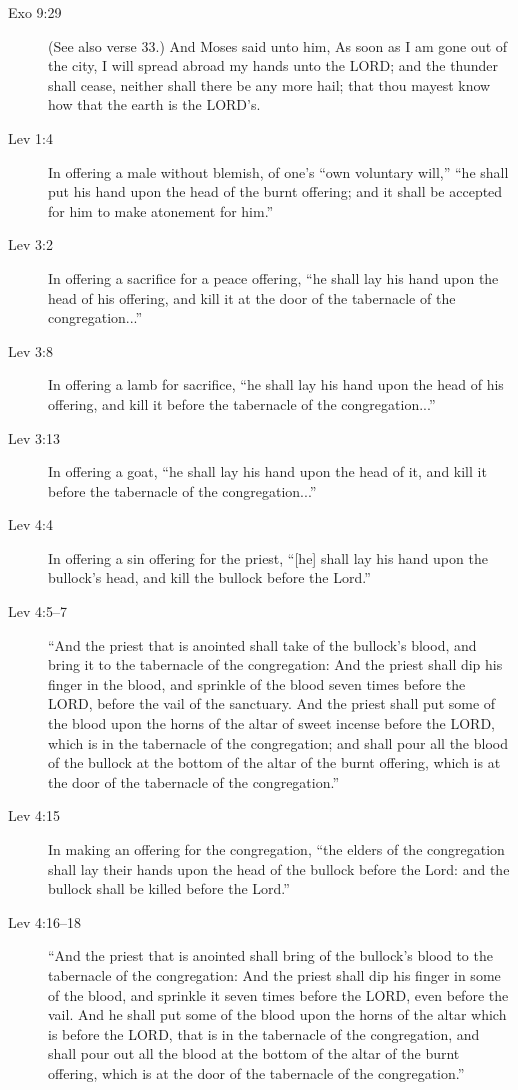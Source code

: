 			\begin{description}
			\item[Exo 9:29] (See also verse 33.) And Moses said unto him, As soon as I am gone out of the city, I will spread abroad my hands unto the LORD; and the thunder shall cease, neither shall there be any more hail; that thou mayest know how that the earth is the LORD's.
			\item[Lev 1:4] In offering a male without blemish, of one's ``own voluntary will,'' ``he shall put his hand upon the head of the burnt offering; and it shall be accepted for him to make atonement for him.''
			\item[Lev 3:2] In offering a sacrifice for a peace offering, ``he shall lay his hand upon the head of his offering, and kill it at the door of the tabernacle of the congregation...''
			\item[Lev 3:8] In offering a lamb for sacrifice, ``he shall lay his hand upon the head of his offering, and kill it before the tabernacle of the congregation...''
			\item[Lev 3:13] In offering a goat, ``he shall lay his hand upon the head of it, and kill it before the tabernacle of the congregation...''
			\item[Lev 4:4] In offering a sin offering for the priest, ``[he] shall lay his hand upon the bullock's head, and kill the bullock before the Lord.''
			\item[Lev 4:5--7] ``And the priest that is anointed shall take of the bullock's blood, and bring it to the tabernacle of the congregation: And the priest shall dip his finger in the blood, and sprinkle of the blood seven times before the LORD, before the vail of the sanctuary. And the priest shall put some of the blood upon the horns of the altar of sweet incense before the LORD, which is in the tabernacle of the congregation; and shall pour all the blood of the bullock at the bottom of the altar of the burnt offering, which is at the door of the tabernacle of the congregation.''
			\item[Lev 4:15] In making an offering for the congregation, ``the elders of the congregation shall lay their hands upon the head of the bullock before the Lord: and the bullock shall be killed before the Lord.''
			\item[Lev 4:16--18] ``And the priest that is anointed shall bring of the bullock's blood to the tabernacle of the congregation: And the priest shall dip his finger in some of the blood, and sprinkle it seven times before the LORD, even before the vail. And he shall put some of the blood upon the horns of the altar which is before the LORD, that is in the tabernacle of the congregation, and shall pour out all the blood at the bottom of the altar of the burnt offering, which is at the door of the tabernacle of the congregation.''

\end{description}
